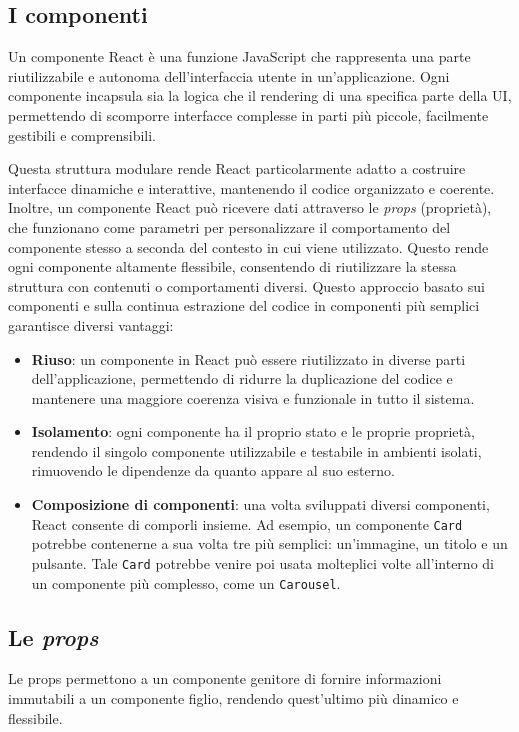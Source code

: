 \documentclass[target=bach,aauheader=,style=]{thud}
\begin{document}
\subsection{I componenti}
Un componente React è una funzione JavaScript che rappresenta una parte riutilizzabile e autonoma dell'interfaccia utente in un'applicazione. Ogni componente incapsula sia la logica che il rendering di una specifica parte della UI, permettendo di scomporre interfacce complesse in parti più piccole, facilmente gestibili e comprensibili. 

\noindent Questa struttura modulare rende React particolarmente adatto a costruire interfacce dinamiche e interattive, mantenendo il codice organizzato e coerente. Inoltre, un componente React può ricevere dati attraverso le \textit{props} (proprietà), che funzionano come parametri per personalizzare il comportamento del componente stesso a seconda del contesto in cui viene utilizzato. Questo rende ogni componente altamente flessibile, consentendo di riutilizzare la stessa struttura con contenuti o comportamenti diversi. Questo approccio basato sui componenti e sulla continua estrazione del codice in componenti più semplici garantisce diversi vantaggi:

\begin{itemize}
    \item \textbf{Riuso}: un componente in React può essere riutilizzato in diverse parti dell'applicazione, permettendo di ridurre la duplicazione del codice e mantenere una maggiore coerenza visiva e funzionale in tutto il sistema.
    \item \textbf{Isolamento}: ogni componente ha il proprio stato e le proprie proprietà, rendendo il singolo componente utilizzabile e testabile in ambienti isolati, rimuovendo le dipendenze da quanto appare al suo esterno.
    \item \textbf{Composizione di componenti}: una volta sviluppati diversi componenti, React consente di comporli insieme. Ad esempio, un componente \texttt{Card} potrebbe contenerne a sua volta tre più semplici: un'immagine, un titolo e un pulsante. Tale \texttt{Card} potrebbe venire poi usata molteplici volte all'interno di un componente più complesso, come un \texttt{Carousel}.
\end{itemize}

\subsection{Le \textit{props}}
Le props permettono a un componente genitore di fornire informazioni immutabili a un componente figlio, rendendo quest'ultimo più dinamico e flessibile.
\end{document}
